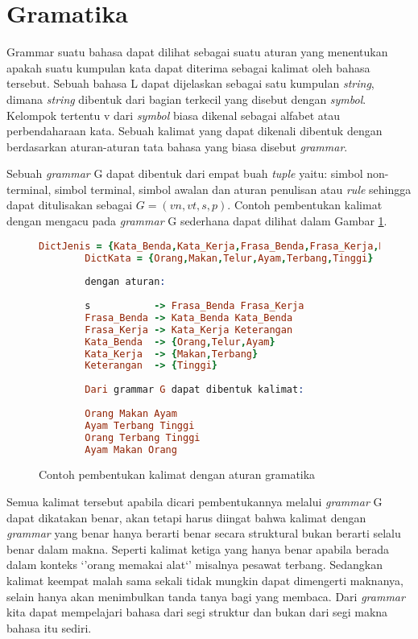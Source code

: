 \section{Gramatika}
Grammar suatu bahasa dapat dilihat sebagai suatu aturan yang menentukan apakah suatu kumpulan kata dapat diterima sebagai kalimat oleh bahasa tersebut. Sebuah bahasa L dapat dijelaskan sebagai satu kumpulan \emph{string}, dimana \emph{string} dibentuk dari bagian terkecil yang disebut dengan \emph{symbol}. Kelompok tertentu v dari \emph{symbol} biasa dikenal sebagai alfabet atau perbendaharaan kata. Sebuah kalimat yang dapat dikenali dibentuk dengan berdasarkan aturan-aturan tata bahasa yang biasa disebut \emph{grammar}.

Sebuah \emph{grammar} G dapat dibentuk dari empat buah \emph{tuple} yaitu: simbol non-terminal, simbol terminal, simbol awalan dan aturan penulisan atau \emph{rule} sehingga dapat ditulisakan sebagai $G=(vn, vt, s, p)$. Contoh pembentukan kalimat dengan mengacu pada \emph{grammar} G sederhana dapat dilihat dalam Gambar \ref{fig:pembentukan_grammar_g}.

\begin{figure}[ht]
	\centering
	\begin{lstlisting}[language=Prolog,xleftmargin=0pt]
		DictJenis = {Kata_Benda,Kata_Kerja,Frasa_Benda,Frasa_Kerja,Keterangan}
		DictKata = {Orang,Makan,Telur,Ayam,Terbang,Tinggi}
		
		dengan aturan:
	
		s           -> Frasa_Benda Frasa_Kerja
		Frasa_Benda -> Kata_Benda Kata_Benda
		Frasa_Kerja -> Kata_Kerja Keterangan
		Kata_Benda  -> {Orang,Telur,Ayam}
		Kata_Kerja  -> {Makan,Terbang}
		Keterangan  -> {Tinggi}
		
		Dari grammar G dapat dibentuk kalimat:
	
		Orang Makan Ayam
		Ayam Terbang Tinggi
		Orang Terbang Tinggi
		Ayam Makan Orang\end{lstlisting}
\caption{Contoh pembentukan kalimat dengan aturan gramatika}
\label{fig:pembentukan_grammar_g}
\end{figure}

Semua kalimat tersebut apabila dicari pembentukannya melalui \emph{grammar} G dapat dikatakan benar, akan tetapi harus diingat bahwa kalimat dengan \emph{grammar} yang benar hanya berarti benar secara struktural bukan berarti selalu benar dalam makna. Seperti kalimat ketiga yang hanya benar apabila berada dalam konteks `'orang memakai alat`' misalnya pesawat terbang. Sedangkan kalimat keempat malah sama sekali tidak mungkin dapat dimengerti maknanya, selain hanya akan menimbulkan tanda tanya bagi yang membaca. Dari \emph{grammar} kita dapat mempelajari bahasa dari segi struktur dan bukan dari segi makna bahasa itu sediri.

